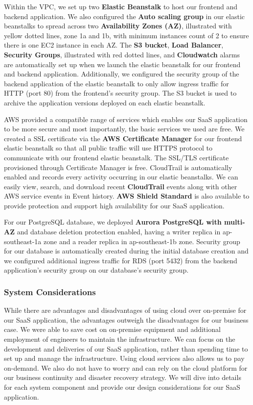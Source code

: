 \documentclass[12pt,a4paper]{article}
\begin{document}
        Within the VPC, we set up two \textbf{Elastic Beanstalk} to host our frontend and backend application. We also configured the \textbf{Auto scaling group} in our elastic beanstalks to spread across two \textbf{Availability Zones (AZ)}, illustrated with yellow dotted lines, zone 1a and 1b, with minimum instances count of 2 to ensure there is one EC2 instance in each AZ. The \textbf{S3 bucket}, \textbf{Load Balancer}, \textbf{Security Groups}, illustrated with red dotted lines, and \textbf{Cloudwatch} alarms are automatically set up when we launch the elastic beanstalk for our frontend and backend application. Additionally, we configured the security group of the backend application of the elastic beanstalk to only allow ingress traffic for HTTP (port 80) from the frontend’s security group. The S3 bucket is used to archive the application versions deployed on each elastic beanstalk.
        
        AWS provided a compatible range of services which enables our SaaS application to be more secure and most importantly, the basic services we used are free. We created a SSL certificate via the \textbf{AWS Certificate Manager} for our frontend elastic beanstalk so that all public traffic will use HTTPS protocol to communicate with our frontend elastic beanstalk. The SSL/TLS certificate provisioned through Certificate Manager is free. CloudTrail is automatically enabled and records every activity occurring in our elastic beanstalks. We can easily view, search, and download recent \textbf{CloudTrail} events along with other AWS service events in Event history. \textbf{AWS Shield Standard} is also available to provide protection and support high availability for our SaaS application. 
        
        For our PostgreSQL database, we deployed \textbf{Aurora PostgreSQL with multi-AZ} and database deletion protection enabled, having a writer replica in ap-southeast-1a zone and a  reader replica in ap-southeast-1b zone. Security group for our database is automatically created during the initial database creation and we configured additional ingress traffic for RDS (port 5432) from the backend application’s security group on our database’s security group. 
        
        \subsubsection{System Considerations}
        
        While there are advantages and disadvantages of using cloud over on-premise for our SaaS application, the advantages outweigh the disadvantages for our business case. We were able to save cost on on-premise equipment and additional employment of engineers to maintain the infrastructure. We can focus on the development and deliveries of our SaaS application, rather than spending time to set up and manage the infrastructure. Using cloud services also allows us to pay on-demand. We also do not have to worry and can rely on the cloud platform for our business continuity and disaster recovery strategy. We will dive into details for each system component and provide our design considerations for our SaaS application.
        
\end{document}
